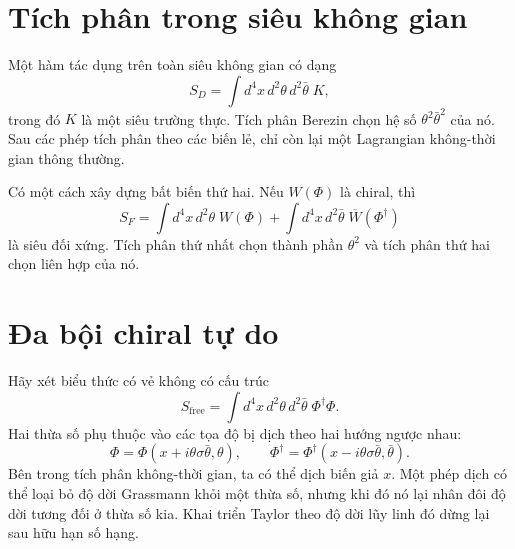 \section{Tích phân trong siêu không gian}

Một hàm tác dụng trên toàn siêu không gian có dạng
\begin{equation}
S_D=\int d^4x\,d^2\theta\,d^2\bar\theta\;K,
\label{eq:l8-D-term-action}
\end{equation}
trong đó \(K\) là một siêu trường thực. Tích phân Berezin chọn hệ số \(\theta^2\bar\theta^2\) của nó. Sau các phép tích phân theo các biến lẻ, chỉ còn lại một Lagrangian không-thời gian thông thường.

Có một cách xây dựng bất biến thứ hai. Nếu \(W(\Phi)\) là chiral, thì
\begin{equation}
S_F=\int d^4x\,d^2\theta\;W(\Phi)
+\int d^4x\,d^2\bar\theta\;\overline{W}(\Phi^\dagger)
\label{eq:l8-F-term-action}
\end{equation}
là siêu đối xứng. Tích phân thứ nhất chọn thành phần \(\theta^2\) và tích phân thứ hai chọn liên hợp của nó.

\begin{classroomqa}
\end{classroomqa}

\section{Đa bội chiral tự do}

Hãy xét biểu thức có vẻ không có cấu trúc
\begin{equation}
S_{\mathrm{free}}
=\int d^4x\,d^2\theta\,d^2\bar\theta\;
\Phi^\dagger\Phi.
\label{eq:l8-free-superaction}
\end{equation}
Hai thừa số phụ thuộc vào các tọa độ bị dịch theo hai hướng ngược nhau:
\begin{equation}
\Phi=\Phi(x+i\theta\sigma\bar\theta,\theta),
\qquad
\Phi^\dagger
=\Phi^\dagger(x-i\theta\sigma\bar\theta,\bar\theta).
\end{equation}
Bên trong tích phân không-thời gian, ta có thể dịch biến giả \(x\). Một phép dịch có thể loại bỏ độ dời Grassmann khỏi một thừa số, nhưng khi đó nó lại nhân đôi độ dời tương đối ở thừa số kia. Khai triển Taylor theo độ dời lũy linh đó dừng lại sau hữu hạn số hạng.

